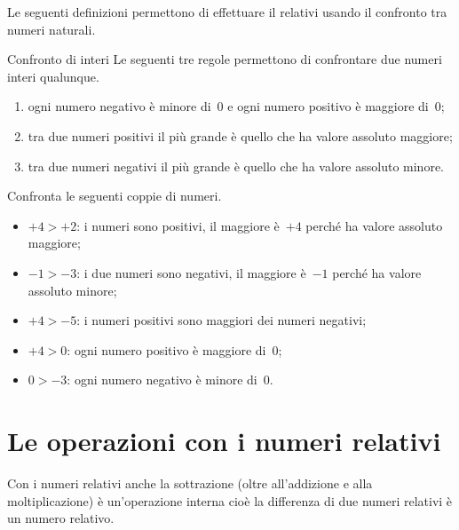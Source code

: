 Le seguenti definizioni permettono di effettuare il  relativi usando il confronto tra numeri 
naturali.

\begin{definizione}{Confronto di interi}{}
Le seguenti tre regole permettono di confrontare due numeri interi qualunque.
\begin{enumerate} [noitemsep] %
\item ogni numero negativo è minore di~0 e ogni numero 
positivo è maggiore di~0;
\item tra due numeri positivi il più grande è quello che ha valore 
assoluto maggiore;
\item tra due numeri negativi il più grande è quello che ha valore 
assoluto minore.
\end{enumerate}

\end{definizione}

\begin{esempio}{}{}
Confronta le seguenti coppie di numeri.
\begin{itemize} [noitemsep]
\item \(+4 > +2\): i numeri sono positivi, il maggiore è~\(+4\) perché ha 
valore assoluto maggiore;
\item \(-1 > -3\): i due numeri sono negativi, il maggiore è~\(-1\) perché 
ha valore assoluto minore;
\item \(+4 > -5\): i numeri positivi sono maggiori dei numeri negativi;
\item \(+4 > 0\): ogni numero positivo è maggiore di~0;
\item \(0 > -3\): ogni numero negativo è minore di~0.
\end{itemize}
{\rettaconfronto}
\end{esempio}


\section{Le operazioni con i numeri relativi}
\label{sec:int_operazioni}

Con i numeri relativi anche la sottrazione (oltre all'addizione e alla 
moltiplicazione) è un'operazione interna 
cioè la differenza di due numeri relativi è un numero relativo.


